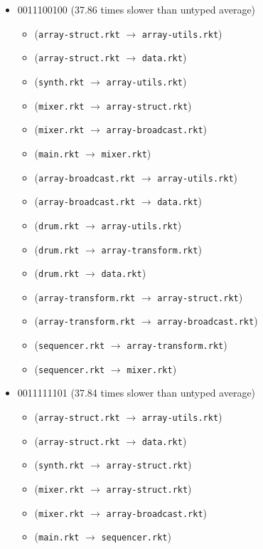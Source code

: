 \documentclass{article}
\newcommand{\mono}[1]{\texttt{#1}}
\begin{document}
\begin{itemize}
\item 0011100100 (37.86 times slower than untyped average)
  \begin{itemize}
  \item (\mono{array-struct.rkt} $\rightarrow$ \mono{array-utils.rkt})
  \item (\mono{array-struct.rkt} $\rightarrow$ \mono{data.rkt})
  \item (\mono{synth.rkt} $\rightarrow$ \mono{array-utils.rkt})
  \item (\mono{mixer.rkt} $\rightarrow$ \mono{array-struct.rkt})
  \item (\mono{mixer.rkt} $\rightarrow$ \mono{array-broadcast.rkt})
  \item (\mono{main.rkt} $\rightarrow$ \mono{mixer.rkt})
  \item (\mono{array-broadcast.rkt} $\rightarrow$ \mono{array-utils.rkt})
  \item (\mono{array-broadcast.rkt} $\rightarrow$ \mono{data.rkt})
  \item (\mono{drum.rkt} $\rightarrow$ \mono{array-utils.rkt})
  \item (\mono{drum.rkt} $\rightarrow$ \mono{array-transform.rkt})
  \item (\mono{drum.rkt} $\rightarrow$ \mono{data.rkt})
  \item (\mono{array-transform.rkt} $\rightarrow$ \mono{array-struct.rkt})
  \item (\mono{array-transform.rkt} $\rightarrow$ \mono{array-broadcast.rkt})
  \item (\mono{sequencer.rkt} $\rightarrow$ \mono{array-transform.rkt})
  \item (\mono{sequencer.rkt} $\rightarrow$ \mono{mixer.rkt})
  \end{itemize}
\item 0011111101 (37.84 times slower than untyped average)
  \begin{itemize}
  \item (\mono{array-struct.rkt} $\rightarrow$ \mono{array-utils.rkt})
  \item (\mono{array-struct.rkt} $\rightarrow$ \mono{data.rkt})
  \item (\mono{synth.rkt} $\rightarrow$ \mono{array-struct.rkt})
  \item (\mono{mixer.rkt} $\rightarrow$ \mono{array-struct.rkt})
  \item (\mono{mixer.rkt} $\rightarrow$ \mono{array-broadcast.rkt})
  \item (\mono{main.rkt} $\rightarrow$ \mono{sequencer.rkt})

\end{itemize}
\end{itemize}
\end{document}
